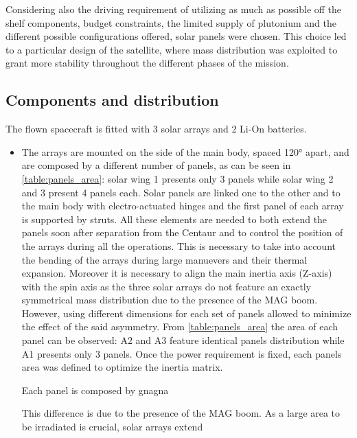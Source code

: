 Considering also the driving requirement of utilizing as much as possible off the shelf components, budget constraints, the limited supply of plutonium and the different possible configurations offered, solar panels were chosen. This choice led to a particular design of the satellite, where mass distribution was exploited to grant more stability throughout the different phases of the mission.  

\subsection{Components and distribution}
\label{subsec:components_and_distribution}

The flown spacecraft is fitted with 3 solar arrays and 2 Li-On batteries. 

\begin{itemize}

\item The arrays are mounted on the side of the main body, spaced 120° apart, and are composed by a different number of panels, as can be seen in \autoref{table:panels_area}: solar wing 1 presents only 3 panels while solar wing 2 and 3 present 4 panels each. Solar panels are linked one to the other and to the main body with electro-actuated hinges and the first panel of each array is supported by struts. All these elements are needed to both extend the panels soon after separation from the Centaur and to control the position of the arrays during all the operations. This is necessary to take into account the bending of the arrays during large manuevers and their thermal expansion. Moreover it is necessary to align the main inertia axis (Z-axis) with the spin axis as the three solar arrays do not feature an exactly symmetrical mass distribution due to the presence of the MAG boom.
However, using different dimensions for each set of panels allowed to minimize the effect of the said asymmetry. From \autoref{table:panels_area} the area of each panel can be observed: A2 and A3 feature identical panels distribution while A1 presents only 3 panels. Once the power requirement is fixed, each panels area was defined to optimize the inertia matrix.   




Each panel is composed by gnagna

This  difference is due to the presence of the MAG boom. As a large area to be irradiated is crucial, solar arrays extend 

\end{itemize}

